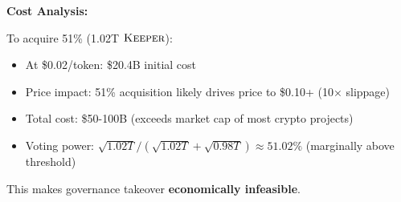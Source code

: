 \textbf{Cost Analysis:}

To acquire 51\% (1.02T $\textsc{Keeper}$):
\begin{itemize}
\item At \$0.02/token: \$20.4B initial cost
\item Price impact: 51\% acquisition likely drives price to \$0.10+ (10× slippage)
\item Total cost: \$50-100B (exceeds market cap of most crypto projects)
\item Voting power: $\sqrt{1.02T} / (\sqrt{1.02T} + \sqrt{0.98T}) \approx 51.02\%$ (marginally above threshold)
\end{itemize}

This makes governance takeover \textbf{economically infeasible}.

